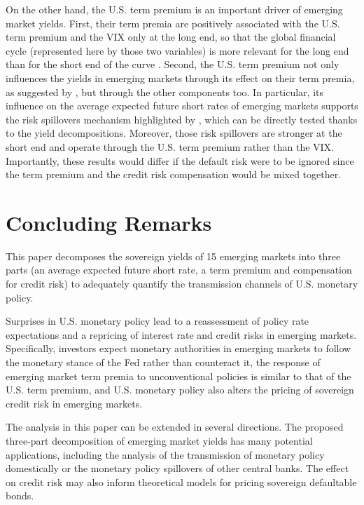 \documentclass[a4paper, 12pt]{article}
\begin{document}
On the other hand, the U.S. term premium is an important driver of emerging market yields. First, their term premia are positively associated with the U.S. term premium and the VIX only at the long end, so that the global financial cycle (represented here by those two variables) is more relevant for the long end than for the short end of the curve \citep{Obstfeld:2015}. Second, the U.S. term premium not only influences the yields in emerging markets through its effect on their term premia, as suggested by \cite{Turner:2014}, but through the other components too. In particular, its influence on the average expected future short rates of emerging markets supports the risk spillovers mechanism highlighted by \cite{Kalemli-Ozcan:2019}, which can be directly tested thanks to the yield decompositions. Moreover, those risk spillovers are stronger at the short end and operate through the U.S. term premium rather than the VIX. Importantly, these results would differ if the default risk were to be ignored since the term premium and the credit risk compensation would be mixed together. 


\section{Concluding Remarks} \label{sec:conclusions}
This paper decomposes the sovereign yields of 15 emerging markets into three parts (an average expected future short rate, a term premium and compensation for credit risk) to adequately quantify the transmission channels of U.S. monetary policy. 

Surprises in U.S. monetary policy lead to a reassessment of policy rate expectations and a repricing of interest rate and credit risks in emerging markets. Specifically, investors expect monetary authorities in emerging markets to follow the monetary stance of the Fed rather than counteract it, the response of emerging market term premia to unconventional policies is similar to that of the U.S. term premium, and U.S. monetary policy also alters the pricing of sovereign credit risk in emerging markets. 

The analysis in this paper can be extended in several directions. The proposed three-part decomposition of emerging market yields has many potential applications, including the analysis of the transmission of monetary policy domestically or the monetary policy spillovers of other central banks. The effect on credit risk may also inform theoretical models for pricing sovereign defaultable bonds. 
\end{document}
